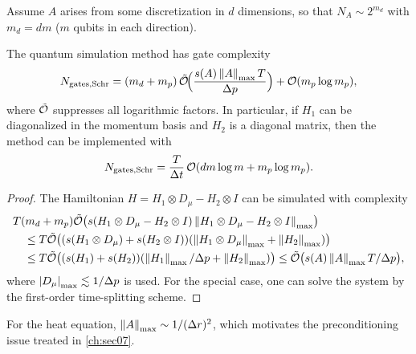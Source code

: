 Assume $A$ arises from some discretization in $d$ dimensions, so that
$N_A \sim 2^{m_d}$ with $m_d = dm$ ($m$ qubits in each direction).

\begin{theorem}
The quantum simulation method has gate complexity
\begin{equation}
  N_{\mathrm{gates}, \mathrm{Schr}} = (m_d + m_p)\,\tilde{\mathcal{O}}\!\Bigl(\frac{s(A)\left\lVert A \right\rVert_{\max} T}{\Delta p}\Bigr) + \mathcal{O}(m_p\log m_p),
\end{equation}
where $\tilde{\mathcal{O}}$ suppresses all logarithmic factors. In particular, if $H_1$
can be diagonalized in the momentum basis and $H_2$ is a diagonal matrix, then the
method can be implemented with
\begin{equation}
  N_{\mathrm{gates}, \mathrm{Schr}} = \frac{T}{\Delta t}\,\mathcal{O}(dm\log m + m_p\log m_p).
\end{equation}
\end{theorem}

\begin{proof}
The Hamiltonian $H = H_1 \otimes D_\mu - H_2 \otimes I$ can be simulated with
complexity
\begin{align}
  &T(m_d + m_p)\tilde{\mathcal{O}}\bigl(s(H_1 \otimes D_\mu - H_2 \otimes I)\left\lVert H_1 \otimes D_\mu - H_2 \otimes I \right\rVert_{\max}\bigr) \notag\\
  &\quad \le T\tilde{\mathcal{O}}\bigl((s(H_1 \otimes D_\mu) + s(H_2 \otimes I))(\left\lVert H_1 \otimes D_\mu \right\rVert_{\max} + \left\lVert H_2 \right\rVert_{\max})\bigr) \notag\\
  &\quad \le T\tilde{\mathcal{O}}\bigl((s(H_1) + s(H_2))(\left\lVert H_1 \right\rVert_{\max}/\Delta p + \left\lVert H_2 \right\rVert_{\max})\bigr)
  \le \tilde{\mathcal{O}}\bigl(s(A)\left\lVert A \right\rVert_{\max} T/\Delta p\bigr),
\end{align}
where $\left\lvert D_\mu \right\rvert_{\max} \lesssim 1/\Delta p$ is used. For the special case, one
can solve the system by the first-order time-splitting scheme.
\end{proof}

For the heat equation, $\left\lVert A \right\rVert_{\max} \sim 1/(\Delta r)^2$, which motivates the
preconditioning issue treated in \cref{ch:sec07}.
